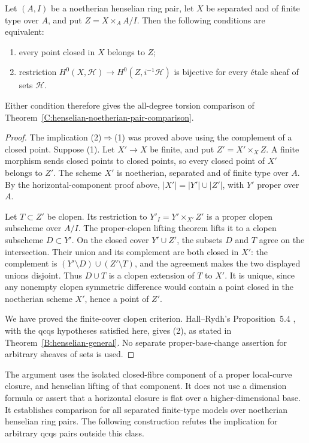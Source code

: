 \begin{corollary}\label{C:henselian-noetherian-closedpoint-criterion}
Let $(A,I)$ be a noetherian henselian ring pair, let $X$ be
separated and of finite type over $A$, and put $Z=X\times_A A/I$.
Then the following conditions are equivalent:
\begin{enumerate}
\item every point closed in $X$ belongs to $Z$;
\item restriction $H^0(X,\mathcal H)\to H^0(Z,i^{-1}\mathcal H)$
is bijective for every \'etale sheaf of sets $\mathcal H$.
\end{enumerate}
Either condition therefore gives the all-degree torsion comparison
of Theorem~\ref{C:henselian-noetherian-pair-comparison}.
\end{corollary}
\begin{proof}
The implication (2)$\Rightarrow$(1) was proved above using the
complement of a closed point. Suppose (1). Let $X'\to X$ be
finite, and put $Z'=X'\times_XZ$. A finite morphism sends closed
points to closed points, so every closed point of $X'$ belongs
to $Z'$. The scheme $X'$ is noetherian, separated and of finite
type over $A$. By the horizontal-component proof above,
$|X'|=|Y'|\cup|Z'|$, with $Y'$ proper over $A$.

Let $T\subset Z'$ be clopen. Its restriction to
$Y'_I=Y'\times_{X'}Z'$ is a proper clopen subscheme over $A/I$.
The proper-clopen lifting theorem
\cite[Lemma~37.53.9, Tag~0CT9]{BStacks} lifts it to a clopen subscheme
$D\subset Y'$. On the closed cover $Y'\cup Z'$, the subsets
$D$ and $T$ agree on the intersection. Their union and its
complement are both closed in $X'$: the complement is
$(Y'\setminus D)\cup(Z'\setminus T)$, and the agreement makes
the two displayed unions disjoint. Thus $D\cup T$ is a clopen
extension of $T$ to $X'$. It is unique, since any nonempty
clopen symmetric difference would contain a point closed in
the noetherian scheme $X'$, hence a point of $Z'$.

We have proved the finite-cover clopen criterion. Hall--Rydh's
Proposition~5.4 \cite{BHallRydh2023}, with the qcqs hypotheses satisfied here, gives
(2), as stated in Theorem~\ref{B:henselian-general}. No separate
proper-base-change assertion for arbitrary sheaves of sets
is used.
\end{proof}

The argument uses the isolated closed-fibre component of a
proper local-curve closure, and henselian lifting of that
component. It does not use a dimension formula or assert that
a horizontal closure is flat over a higher-dimensional base.
It establishes comparison for all separated finite-type models over
noetherian henselian ring pairs. The following construction refutes
the implication for
arbitrary qcqs pairs outside this class.


